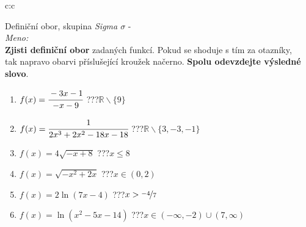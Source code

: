 \documentclass[10pt]{report}
\begin{document}
\newpage
\thispagestyle{empty}
\begin{tabular}{c:c}
\begin{minipage}[c][99mm][t]{0.49\linewidth}
\begin{center}
\vspace{7mm}
{\huge Definiční obor, skupina \textit{Sigma $\sigma$} -}\\[4.5mm]
\textit{Meno:}\phantom{xxxxxxxxxxxxxxxxxxxxxxxxxxxxxxxxxxxxxxxxxxxxxxxxxxxxxxxxxxxxxxxxx}\\[3.5mm]
\textbf{Zjisti definiční obor} zadaných funkcí. Pokud se shoduje s tím za otazníky,\\tak napravo obarvi příslušející kroužek načerno. \textbf{Spolu odevzdejte výsledné slovo}.\\[3mm]
\begin{minipage}{0.77\linewidth}
\begin{center}
\begin{varwidth}{\textwidth}
\begin{enumerate}
\normalsize
\item $f(x)=\cfrac{-3x-1}{-x-9}$\quad \dotfill\; ???\;\dotfill \quad $\mathbb{R}\smallsetminus\{9\}$
\item $f(x)=\cfrac{1}{2x^3+2x^2-18x-18}$\quad \dotfill\; ???\;\dotfill \quad $\mathbb{R}\smallsetminus\{3,-3,-1\}$
\item $f(x)=4\sqrt{-x+8}$\quad \dotfill\; ???\;\dotfill \quad $x\leq8$
\item $f(x)=\sqrt{-x^2+2x}$\quad \dotfill\; ???\;\dotfill \quad $x\in(0 , 2)$
\item $f(x)=2\ln{(7x-4)}$\quad \dotfill\; ???\;\dotfill \quad $x>\nicefrac{-4}{7}$
\item $f(x)=\ln{(x^2-5x-14)}$\quad \dotfill\; ???\;\dotfill \quad $x\in(-\infty , -2)\cup(7 , \infty)$
\end{enumerate}
\end{varwidth}
\end{center}
\end{minipage}
\begin{minipage}{0.20\linewidth}

\end{minipage}
\end{center}
\end{minipage}
\end{tabular}
\end{document}
